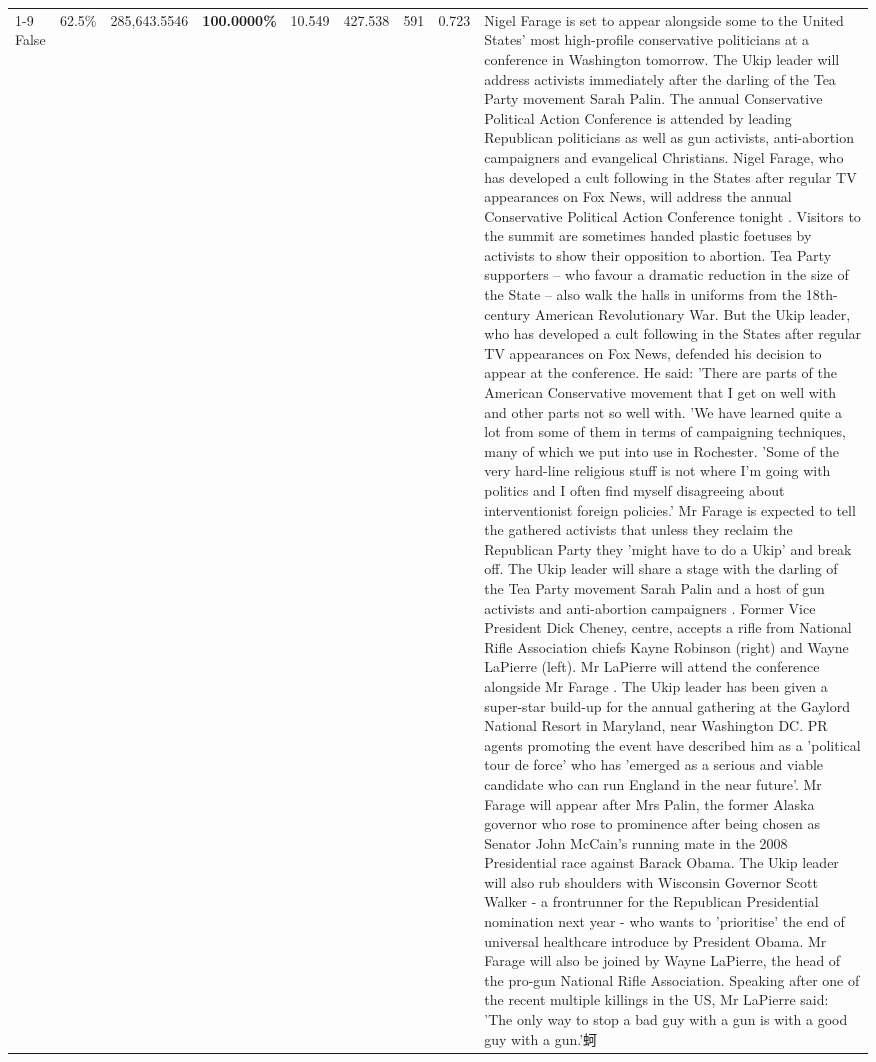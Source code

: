\begin{table}[H]
\begin{tabular}{lllrlllll}
\cline{1-9}
False & 62.5\% & \color{red} 285,643.5546 & \bfseries \color{red} 100.0000\% & 10.549 & 427.538 & 591 & 0.723 & Nigel Farage is set to appear alongside some to the United States' most high-profile conservative politicians at a conference in Washington tomorrow. The Ukip leader will address activists immediately after the darling of the Tea Party movement Sarah Palin. The annual Conservative Political Action Conference is attended by leading Republican politicians as well as gun activists, anti-abortion campaigners and evangelical Christians. Nigel Farage, who has developed a cult following in the States after regular TV appearances on Fox News, will address the annual Conservative Political Action Conference tonight . Visitors to the summit are sometimes handed plastic foetuses by activists to show their opposition to abortion. Tea Party supporters – who favour a dramatic reduction in the size of the State – also walk the halls in uniforms from the 18th-century American Revolutionary War. But the Ukip leader, who has developed a cult following in the States after regular TV appearances on Fox News, defended his decision to appear at the conference. He said: 'There are parts of the American Conservative movement that I get on well with and other parts not so well with. 'We have learned quite a lot from some of them in terms of campaigning techniques, many of which we put into use in Rochester. 'Some of the very hard-line religious stuff is not where I'm going with politics and I often find myself disagreeing about interventionist foreign policies.' Mr Farage is expected to tell the gathered activists that unless they reclaim the Republican Party they 'might have to do a Ukip' and break off. The Ukip leader will share a stage with the darling of the Tea Party movement Sarah Palin and a host of gun activists and anti-abortion campaigners . Former Vice President Dick Cheney, centre, accepts a rifle from National Rifle Association chiefs Kayne Robinson (right) and Wayne LaPierre (left). Mr LaPierre will attend the conference alongside Mr Farage . The Ukip leader has been given a super-star build-up for the annual gathering at the Gaylord National Resort in Maryland, near Washington DC. PR agents promoting the event have described him as a 'political tour de force' who has 'emerged as a serious and viable candidate who can run England in the near future'. Mr Farage will appear after Mrs Palin, the former Alaska governor who rose to prominence after being chosen as Senator John McCain's running mate in the 2008 Presidential race against Barack Obama. The Ukip leader will also rub shoulders with Wisconsin Governor Scott Walker - a frontrunner for the Republican Presidential nomination next year - who wants to 'prioritise' the end of universal healthcare introduce by President Obama. Mr Farage will also be joined by Wayne LaPierre, the head of the pro-gun National Rifle Association. Speaking after one of the recent multiple killings in the US, Mr LaPierre said: 'The only way to stop a bad guy with a gun is with a good guy with a gun.'蚵 \\

\end{tabular}
\end{table}
